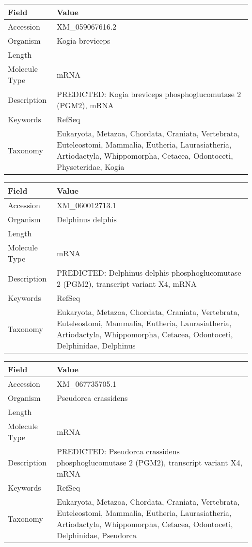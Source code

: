 \documentclass[10pt]{article}
\begin{document}
\vspace{1em}
{\footnotesize
\begin{longtable}{>{\raggedright\arraybackslash}p{4.5cm} >{\raggedright\arraybackslash}p{11.5cm}}
\textbf{Field} & \textbf{Value} \\
\hline
Accession & XM\_059067616.2 \\
Organism & Kogia breviceps \\
Length & 4214 \\
Molecule Type & mRNA \\
Description & PREDICTED: Kogia breviceps phosphoglucomutase 2 (PGM2), mRNA \\
Keywords & RefSeq \\
Taxonomy & Eukaryota, Metazoa, Chordata, Craniata, Vertebrata, Euteleostomi, Mammalia, Eutheria, Laurasiatheria, Artiodactyla, Whippomorpha, Cetacea, Odontoceti, Physeteridae, Kogia \\
\end{longtable}
}

\vspace{1em}
{\footnotesize
\begin{longtable}{>{\raggedright\arraybackslash}p{4.5cm} >{\raggedright\arraybackslash}p{11.5cm}}
\textbf{Field} & \textbf{Value} \\
\hline
Accession & XM\_060012713.1 \\
Organism & Delphinus delphis \\
Length & 6671 \\
Molecule Type & mRNA \\
Description & PREDICTED: Delphinus delphis phosphoglucomutase 2 (PGM2), transcript variant X4, mRNA \\
Keywords & RefSeq \\
Taxonomy & Eukaryota, Metazoa, Chordata, Craniata, Vertebrata, Euteleostomi, Mammalia, Eutheria, Laurasiatheria, Artiodactyla, Whippomorpha, Cetacea, Odontoceti, Delphinidae, Delphinus \\
\end{longtable}
}

\vspace{1em}
{\footnotesize
\begin{longtable}{>{\raggedright\arraybackslash}p{4.5cm} >{\raggedright\arraybackslash}p{11.5cm}}
\textbf{Field} & \textbf{Value} \\
\hline
Accession & XM\_067735705.1 \\
Organism & Pseudorca crassidens \\
Length & 12512 \\
Molecule Type & mRNA \\
Description & PREDICTED: Pseudorca crassidens phosphoglucomutase 2 (PGM2), transcript variant X4, mRNA \\
Keywords & RefSeq \\
Taxonomy & Eukaryota, Metazoa, Chordata, Craniata, Vertebrata, Euteleostomi, Mammalia, Eutheria, Laurasiatheria, Artiodactyla, Whippomorpha, Cetacea, Odontoceti, Delphinidae, Pseudorca \\
\end{longtable}
}
\end{document}
